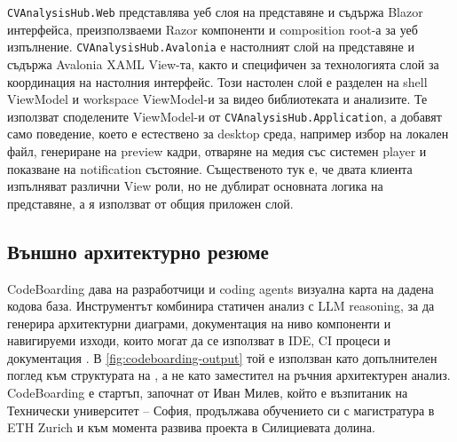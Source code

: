 \texttt{CVAnalysisHub.Web} представлява уеб слоя на представяне и съдържа Blazor интерфейса, преизползваеми Razor компоненти и composition root-а за уеб изпълнение. \texttt{CVAnalysisHub.Avalonia} е настолният слой на представяне и съдържа Avalonia XAML View-та, както и специфичен за технологията слой за координация на настолния интерфейс. Този настолен слой е разделен на shell ViewModel и workspace ViewModel-и за видео библиотеката и анализите. Те използват споделените ViewModel-и от \texttt{CVAnalysisHub.Application}, а добавят само поведение, което е естествено за desktop среда, например избор на локален файл, генериране на preview кадри, отваряне на медия със системен player и показване на notification състояние. Същественото тук е, че двата клиента изпълняват различни View роли, но не дублират основната логика на представяне, а я използват от общия приложен слой.

\subsection{Външно архитектурно резюме}

CodeBoarding дава на разработчици и coding agents визуална карта на дадена кодова база. Инструментът комбинира статичен анализ с LLM reasoning, за да генерира архитектурни диаграми, документация на ниво компоненти и навигируеми изходи, които могат да се използват в IDE, CI процеси и документация \cite{codeboarding}. В \cref{fig:codeboarding-output} той е използван като допълнителен поглед към структурата на \projectname, а не като заместител на ръчния архитектурен анализ. CodeBoarding е стартъп, започнат от Иван Милев, който е възпитаник на Технически университет -- София, продължава обучението си с магистратура в ETH Zurich и към момента развива проекта в Силициевата долина.

